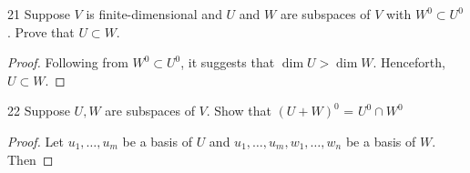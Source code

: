 \documentclass{article}
\newenvironment{problem}[1]{\begin{prob*}{#1}{}}{\end{prob*}}
\begin{document}
\begin{problem}{21}
Suppose $V$ is finite-dimensional and $U$ and $W$ are subspaces of $V$ with $W^0 \subset U^{0}$. Prove that $U \subset W$.
\end{problem}
\begin{proof}
	Following from $W^0 \subset U^{0}$, it suggests that $\operatorname{dim} U > \operatorname{dim} W$. Henceforth, $U \subset W$.
\end{proof}

\begin{problem}{22}
Suppose $U, W$ are subspaces of $V$. Show that $(U+W)^{0}$ = $U^{0} \cap W^{0}$
\end{problem}
\begin{proof}
  Let $u_1, \ldots , u_m$ be a basis of $U$ and $u_1, \ldots ,u_m, w_1, \ldots ,w_n$ be a basis of $W$. Then 
\end{proof}

\end{document}
